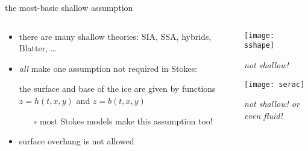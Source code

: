 \begin{frame}{the most-basic shallow assumption}

\begin{columns}

\begin{column}{0.6\textwidth}
\begin{itemize}
\item there are many shallow theories: SIA, SSA, hybrids, Blatter, \dots
\item \emph{all} make one assumption not required in Stokes:

\begin{center}
\alert{the surface and base of the ice are given by functions $z=h(t,x,y)$ and $z=b(t,x,y)$}
\end{center}
    \begin{itemize}
    \item[$\circ$] most Stokes models make this assumption too!
    \end{itemize}
\item surface overhang is not allowed
\end{itemize}
\end{column}

\begin{column}{0.4\textwidth}
\texttt{[image: sshape]}

\scriptsize
\begin{center}
\emph{not shallow!}
\end{center}
\vspace{6mm}

\texttt{[image: serac]}

\begin{center}
\emph{not shallow! or even fluid!}
\end{center}
\end{column}
\end{columns}
\end{frame}


